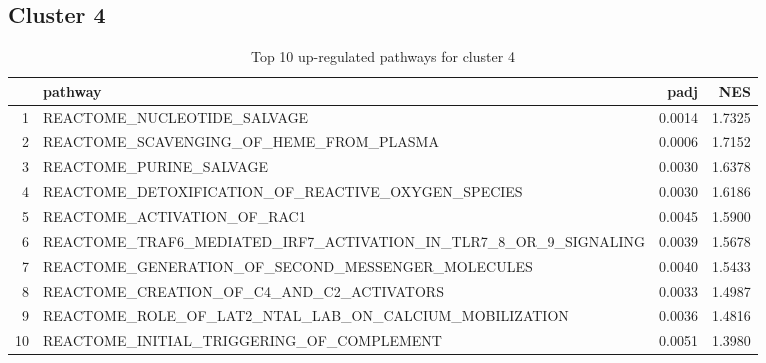 \documentclass{article}
\begin{document}
\subsection{Cluster 4 }
\begin{table}[H]
\centering
\begin{tabularx}{\textwidth}{rlrr}
  \hline
 & pathway & padj & NES \\ 
  \hline
1 & REACTOME\_NUCLEOTIDE\_SALVAGE & 0.0014 & 1.7325 \\ 
  2 & REACTOME\_SCAVENGING\_OF\_HEME\_FROM\_PLASMA & 0.0006 & 1.7152 \\ 
  3 & REACTOME\_PURINE\_SALVAGE & 0.0030 & 1.6378 \\ 
  4 & REACTOME\_DETOXIFICATION\_OF\_REACTIVE\_OXYGEN\_SPECIES & 0.0030 & 1.6186 \\ 
  5 & REACTOME\_ACTIVATION\_OF\_RAC1 & 0.0045 & 1.5900 \\ 
  6 & REACTOME\_TRAF6\_MEDIATED\_IRF7\_ACTIVATION\_IN\_TLR7\_8\_OR\_9\_SIGNALING & 0.0039 & 1.5678 \\ 
  7 & REACTOME\_GENERATION\_OF\_SECOND\_MESSENGER\_MOLECULES & 0.0040 & 1.5433 \\ 
  8 & REACTOME\_CREATION\_OF\_C4\_AND\_C2\_ACTIVATORS & 0.0033 & 1.4987 \\ 
  9 & REACTOME\_ROLE\_OF\_LAT2\_NTAL\_LAB\_ON\_CALCIUM\_MOBILIZATION & 0.0036 & 1.4816 \\ 
  10 & REACTOME\_INITIAL\_TRIGGERING\_OF\_COMPLEMENT & 0.0051 & 1.3980 \\ 
   \hline
\end{tabularx}
\caption{Top 10 up-regulated pathways for cluster 4} 
\label{tab:q3_2_4}
\end{table}
\end{document}
